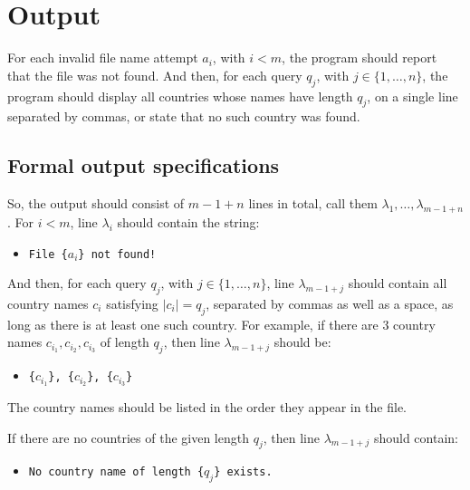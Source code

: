 \pagebreak
\section*{Output}

For each invalid file name attempt $a_i$, with $i < m$,
the program should report that the file was not found.
And then, for each query $q_j$, with $j \in \{1, \dots, n\}$,
the program should display all countries
whose names have length $q_j$,
on a single line separated by commas,
or state that no such country was found.

\subsection*{Formal output specifications}
So, the output should consist of $m-1 + n$ lines in total,
call them $\lambda_1, \dots, \lambda_{m-1 + n}$.
For $i < m$, line $\lambda_i$ should contain the string:
\begin{itemize}
    \item
    \texttt{File \{$a_i$\} not found!}
\end{itemize}
And then, for each query $q_j$, with $j \in \{1, \dots, n\}$,
line $\lambda_{m-1 + j}$ should contain
all country names $c_i$ satisfying $|c_i| = q_j$,
separated by commas as well as a space,
as long as there is at least one such country.
For example, if there are $3$ country names
$c_{i_1}, c_{i_2}, c_{i_3}$ of length $q_j$,
then line $\lambda_{m-1 + j}$ should be:
\begin{itemize}
    \item
    \texttt{\{$c_{i_1}$\}, \{$c_{i_2}$\}, \{$c_{i_3}$\}}
\end{itemize}
The country names should be listed in the order they appear in the file.

If there are no countries of the given length $q_j$,
then line $\lambda_{m-1 + j}$ should contain:
\begin{itemize}
    \item
    \texttt{No country name of length \{$q_j$\} exists.}
\end{itemize}
